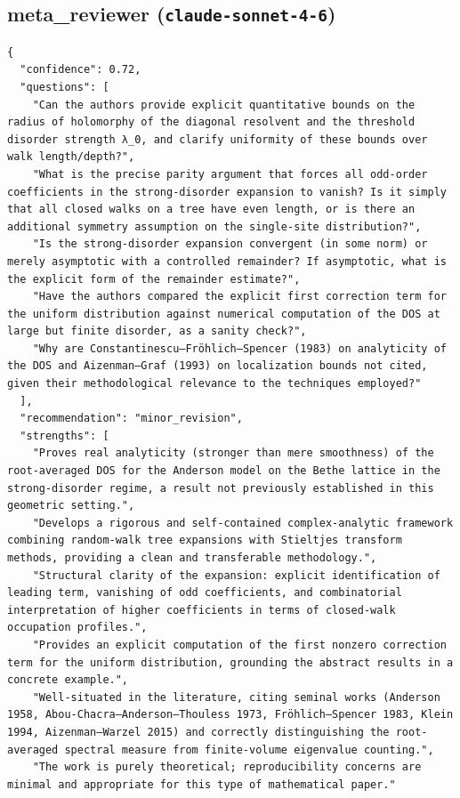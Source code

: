 \documentclass[11pt]{article}
\begin{document}
\subsection*{meta_reviewer (\texttt{claude-sonnet-4-6})}
\begin{verbatim}
{
  "confidence": 0.72,
  "questions": [
    "Can the authors provide explicit quantitative bounds on the radius of holomorphy of the diagonal resolvent and the threshold disorder strength λ_0, and clarify uniformity of these bounds over walk length/depth?",
    "What is the precise parity argument that forces all odd-order coefficients in the strong-disorder expansion to vanish? Is it simply that all closed walks on a tree have even length, or is there an additional symmetry assumption on the single-site distribution?",
    "Is the strong-disorder expansion convergent (in some norm) or merely asymptotic with a controlled remainder? If asymptotic, what is the explicit form of the remainder estimate?",
    "Have the authors compared the explicit first correction term for the uniform distribution against numerical computation of the DOS at large but finite disorder, as a sanity check?",
    "Why are Constantinescu–Fröhlich–Spencer (1983) on analyticity of the DOS and Aizenman–Graf (1993) on localization bounds not cited, given their methodological relevance to the techniques employed?"
  ],
  "recommendation": "minor_revision",
  "strengths": [
    "Proves real analyticity (stronger than mere smoothness) of the root-averaged DOS for the Anderson model on the Bethe lattice in the strong-disorder regime, a result not previously established in this geometric setting.",
    "Develops a rigorous and self-contained complex-analytic framework combining random-walk tree expansions with Stieltjes transform methods, providing a clean and transferable methodology.",
    "Structural clarity of the expansion: explicit identification of leading term, vanishing of odd coefficients, and combinatorial interpretation of higher coefficients in terms of closed-walk occupation profiles.",
    "Provides an explicit computation of the first nonzero correction term for the uniform distribution, grounding the abstract results in a concrete example.",
    "Well-situated in the literature, citing seminal works (Anderson 1958, Abou-Chacra–Anderson–Thouless 1973, Fröhlich–Spencer 1983, Klein 1994, Aizenman–Warzel 2015) and correctly distinguishing the root-averaged spectral measure from finite-volume eigenvalue counting.",
    "The work is purely theoretical; reproducibility concerns are minimal and appropriate for this type of mathematical paper."

\end{verbatim}
\end{document}
